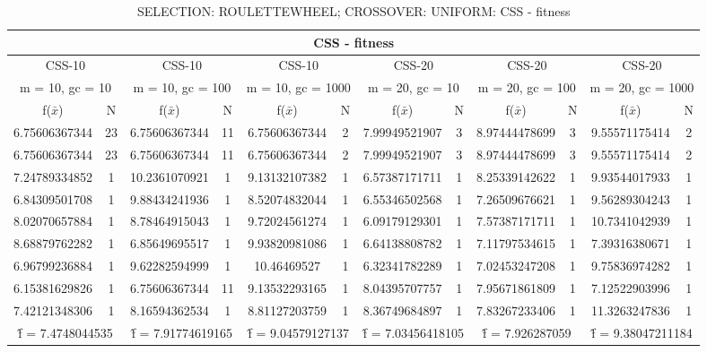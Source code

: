 \begin{table}[H]
	\centering
	\caption{SELECTION: ROULETTEWHEEL; CROSSOVER: UNIFORM: CSS - fitness}
	\begin{adjustbox}{width=1\textwidth}
		\begin{tabular}{ |c|c||c|c||c|c||c|c||c|c||c|c| }
			\hline
			\multicolumn{12}{|c|}{CSS - fitness} \\
			\hline
			\multicolumn{2}{|c||}{CSS-10} & \multicolumn{2}{c||}{CSS-10} & \multicolumn{2}{c||}{CSS-10} & \multicolumn{2}{c||}{CSS-20} & \multicolumn{2}{c||}{CSS-20} & \multicolumn{2}{c|}{CSS-20}\\
			\hline
			\multicolumn{2}{|c||}{m = 10, gc = 10} & \multicolumn{2}{c||}{m = 10, gc = 100} & \multicolumn{2}{c||}{m = 10, gc = 1000} & \multicolumn{2}{c||}{m = 20, gc = 10} & \multicolumn{2}{c||}{m = 20, gc = 100} & \multicolumn{2}{c|}{m = 20, gc = 1000}\\
			\hline
			f($\bar{x}$) & N & f($\bar{x}$) & N & f($\bar{x}$) & N & f($\bar{x}$) & N & f($\bar{x}$) & N & f($\bar{x}$) & N\\
			\hline
			\hline
			6.75606367344 & 23 & 6.75606367344 & 11 & 6.75606367344 & 2 & 7.99949521907 & 3 & 8.97444478699 & 3 & 9.55571175414 & 2\\
			\hline
			6.75606367344 & 23 & 6.75606367344 & 11 & 6.75606367344 & 2 & 7.99949521907 & 3 & 8.97444478699 & 3 & 9.55571175414 & 2\\
			7.24789334852 & 1 & 10.2361070921 & 1 & 9.13132107382 & 1 & 6.57387171711 & 1 & 8.25339142622 & 1 & 9.93544017933 & 1\\
			6.84309501708 & 1 & 9.88434241936 & 1 & 8.52074832044 & 1 & 6.55346502568 & 1 & 7.26509676621 & 1 & 9.56289304243 & 1\\
			8.02070657884 & 1 & 8.78464915043 & 1 & 9.72024561274 & 1 & 6.09179129301 & 1 & 7.57387171711 & 1 & 10.7341042939 & 1\\
			8.68879762282 & 1 & 6.85649695517 & 1 & 9.93820981086 & 1 & 6.64138808782 & 1 & 7.11797534615 & 1 & 7.39316380671 & 1\\
			6.96799236884 & 1 & 9.62282594999 & 1 & 10.46469527 & 1 & 6.32341782289 & 1 & 7.02453247208 & 1 & 9.75836974282 & 1\\
			6.15381629826 & 1 & 6.75606367344 & 11 & 9.13532293165 & 1 & 8.04395707757 & 1 & 7.95671861809 & 1 & 7.12522903996 & 1\\
			7.42121348306 & 1 & 8.16594362534 & 1 & 8.81127203759 & 1 & 8.36749684897 & 1 & 7.83267233406 & 1 & 11.3263247836 & 1\\
			\hline
			\multicolumn{2}{|c||}{\^{f} = 7.4748044535} & \multicolumn{2}{c||}{\^{f} = 7.91774619165} & \multicolumn{2}{c||}{\^{f} = 9.04579127137} & \multicolumn{2}{c||}{\^{f} = 7.03456418105} & \multicolumn{2}{c||}{\^{f} = 7.926287059} & \multicolumn{2}{c|}{\^{f} = 9.38047211184}\\
			\hline
		\end{tabular}
	\end{adjustbox}
\end{table}
